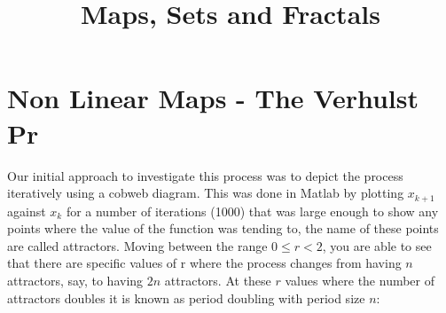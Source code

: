 \documentclass[a4wide, 10pt]{article}
\begin{document}
\title{Maps, Sets and Fractals}

\section{Non Linear Maps - The Verhulst Pr}
Our initial approach to investigate this process was to depict the process iteratively 
 using a cobweb diagram. This was done in Matlab by plotting $x_{k+1}$ against
  $x_{k}$ for a number of iterations (1000) that was large enough to show any points where 
   the value of the function was tending to, the name of these points are called attractors.
    Moving between the range $ 0 \leq r < 2 $, you are able to see that there are specific
     values of r where the process changes from having $n$ attractors, say, to having $2n$
      attractors. At these $r$ values where the number of attractors doubles it is known as
       period doubling with period size $n$: 
\end{document}
